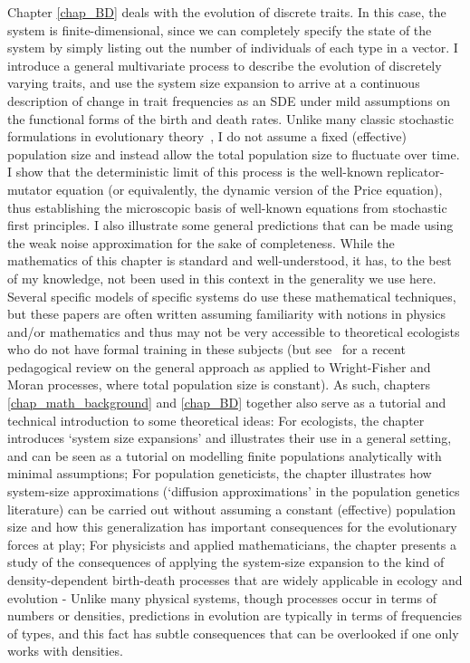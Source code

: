 Chapter \ref{chap_BD} deals with the evolution of discrete traits. In this case, the system is finite-dimensional, since we can completely specify the state of the system by simply listing out the number of individuals of each type in a vector. I introduce a general multivariate process to describe the evolution of discretely varying traits, and use the system size expansion to arrive at a continuous description of change in trait frequencies as an SDE under mild assumptions on the functional forms of the birth and death rates. Unlike many classic stochastic formulations in evolutionary theory~\citep{fisher_genetical_1930,wright_evolution_1931,moran_random_1958,crow_introduction_1970, lande_natural_1976}, I do not assume a fixed (effective) population size and instead allow the total population size to fluctuate over time. I show that the deterministic limit of this process is the well-known replicator-mutator equation (or equivalently, the dynamic version of the Price equation), thus establishing the microscopic basis of well-known equations from stochastic first principles. I also illustrate some general predictions that can be made using the weak noise approximation for the sake of completeness. While the mathematics of this chapter is standard and well-understood, it has, to the best of my knowledge, not been used in this context in the generality we use here. Several specific models of specific systems do use these mathematical techniques, but these papers are often written assuming familiarity with notions in physics and/or mathematics and thus may not be very accessible to theoretical ecologists who do not have formal training in these subjects (but see~\cite{czuppon_understanding_2021} for a recent pedagogical review on the general approach as applied to Wright-Fisher and Moran processes, where total population size is constant). As such, chapters \ref{chap_math_background} and \ref{chap_BD} together also serve as a tutorial and technical introduction to some theoretical ideas: For ecologists, the chapter introduces `system size expansions' and illustrates their use in a general setting, and can be seen as a tutorial on modelling finite populations analytically with minimal assumptions; For population geneticists, the chapter illustrates how system-size approximations (`diffusion approximations' in the population genetics literature) can be carried out without assuming a constant (effective) population size and how this generalization has important consequences for the evolutionary forces at play; For physicists and applied mathematicians, the chapter presents a study of the consequences of applying the system-size expansion to the kind of density-dependent birth-death processes that are widely applicable in ecology and evolution - Unlike many physical systems, though processes occur in terms of numbers or densities, predictions in evolution are typically in terms of frequencies of types, and this fact has subtle consequences that can be overlooked if one only works with densities.


